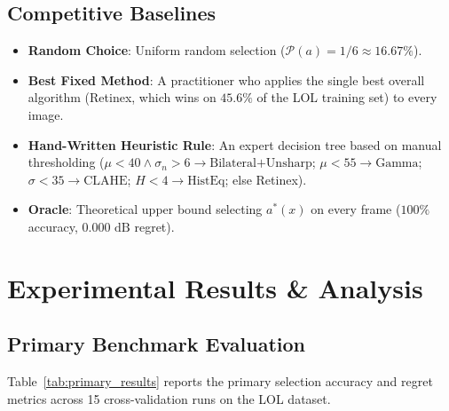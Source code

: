 \documentclass[journal]{IEEEtran}
\begin{document}
\subsection{Competitive Baselines}
\begin{itemize}
    \item \textbf{Random Choice}: Uniform random selection ($\mathcal{P}(a) = 1/6 \approx 16.67\%$).
    \item \textbf{Best Fixed Method}: A practitioner who applies the single best overall algorithm (Retinex, which wins on $45.6\%$ of the LOL training set) to every image.
    \item \textbf{Hand-Written Heuristic Rule}: An expert decision tree based on manual thresholding ($\mu < 40 \land \sigma_n > 6 \to \text{Bilateral+Unsharp}$; $\mu < 55 \to \text{Gamma}$; $\sigma < 35 \to \text{CLAHE}$; $H < 4 \to \text{HistEq}$; else Retinex).
    \item \textbf{Oracle}: Theoretical upper bound selecting $a^*(x)$ on every frame ($100\%$ accuracy, $0.000\text{ dB}$ regret).
\end{itemize}

\section{Experimental Results \& Analysis}

\subsection{Primary Benchmark Evaluation}
Table~\ref{tab:primary_results} reports the primary selection accuracy and regret metrics across 15 cross-validation runs on the LOL dataset.
\end{document}
